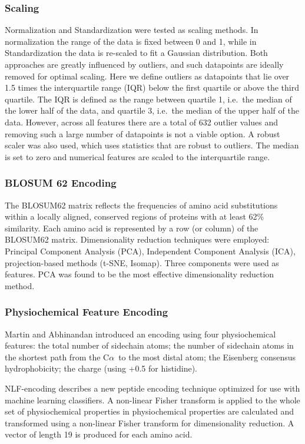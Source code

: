 \documentclass[12pt]{article}
\newcommand{\ca}{\mbox{C$\alpha$}}
\let\shortcite\cite
\begin{document}
\subsubsection{Scaling}
Normalization and Standardization were tested as scaling methods. In normalization the range of the data is fixed between 0 and 1, while in Standardization the data is re-scaled to fit a Gaussian distribution. Both
approaches are greatly influenced by outliers, and such datapoints are
ideally removed for optimal scaling. Here we define outliers as
datapoints that lie over 1.5 times the interquartile range (IQR) below
the first quartile or above the third quartile. The IQR is defined as
the range between quartile 1, i.e.\ the median of the lower half of the
data, and quartile 3, i.e.\ the median of the upper half of the
data. However, across all features there are a total of 632 outlier
values and removing such a large number of datapoints is not a viable
option. A robust scaler\cite{XXXX} was also used, which uses statistics that are
robust to outliers. The median is set to zero and numerical features
are scaled to the interquartile range.

\subsubsection{BLOSUM 62 Encoding}
The BLOSUM62 matrix reflects the frequencies of amino acid
substitutions within a locally aligned, conserved regions of proteins
with at least 62\% similarity. Each amino acid is represented by a row
(or column) of the BLOSUM62 matrix. Dimensionality reduction
techniques were employed: Principal Component Analysis (PCA),
Independent Component Analysis (ICA), projection-based methods (t-SNE,
Isomap). Three components were used as features. PCA was found to be the most effective dimensionality reduction method. 

\subsubsection{Physiochemical Feature Encoding}
Martin and Abhinandan\shortcite{Abhinandan2010} introduced an encoding using
four physiochemical features:
the total number of sidechain atoms; the
number of sidechain atoms in the shortest path from the \ca\ to the most
distal atom; the Eisenberg consensus
hydrophobicity\cite{Eisenberg1982}; the charge (using +0.5 for histidine).

NLF-encoding \shortcite{Nanni2011} describes a new peptide encoding technique optimized for use with machine learning classifiers. A non-linear Fisher transform is applied to the whole set of physiochemical properties in \shortcite{Kawashima2000}
physiochemical properties are calculated and transformed using a
non-linear Fisher transform for dimensionality reduction.  A vector of
length 19 is produced for each amino acid.
\end{document}
